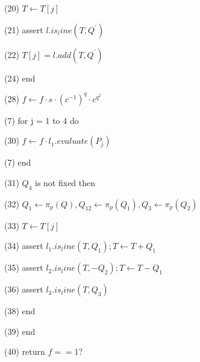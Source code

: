 (20) \indent \indent  $\displaystyle T \leftarrow T[j] $ 

(21) \indent \indent  assert $\displaystyle l.is_line(T, Q^{'}) $ 

(22) \indent \indent  $\displaystyle T[j] = l.add(T, Q^{'}) $ 

(24) \indent  end 

(28) \indent  $\displaystyle f \leftarrow f \cdot s \cdot (c^{-1})^q \cdot c^{q^2} $ 

(7) \indent \indent for j = 1 to 4 do 

(30) \indent \indent $\displaystyle f \leftarrow f \cdot l_1.evaluate(P_{j}) $ 

(7) \indent \indent end 

(31) \indent \indent $Q_4$ is not fixed then 

(32) \indent \indent  $\displaystyle Q_1 \leftarrow \pi_p(Q), Q_12\leftarrow \pi_p(Q_1), Q_3 \leftarrow \pi_p(Q_2) $ 

(33) \indent \indent  $\displaystyle T \leftarrow T[j] $ 

(34) \indent \indent  assert $\displaystyle l_1.is_line(T, Q_1); T \leftarrow T + Q_1 $ 

(35) \indent \indent  assert $\displaystyle l_2.is_line(T, -Q_2); T \leftarrow T - Q_1 $ 

(36) \indent \indent  assert $\displaystyle l_3.is_line(T, Q_3) $ 

(38) \indent end 

(39) end 

(40) return $\displaystyle f == 1? $ 
